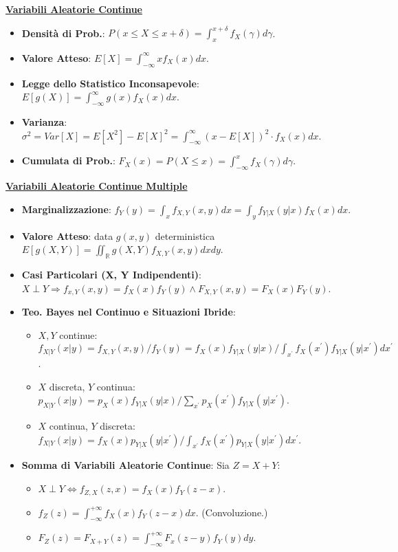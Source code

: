 \documentclass{article}
\begin{document}
\begin{multicols*}{3}
\textbf{\underline{Variabili Aleatorie Continue}}
\begin{itemize}
    \item \textbf{Densità di Prob.}: $P(x\leq X\leq x+\delta)=\int_{x}^{x+\delta}f_{X}(\gamma)d\gamma$.
    \item \textbf{Valore Atteso}: $E[X]=\int_{-\infty}^{\infty}xf_{X}(x)dx$.
    \item \textbf{Legge dello Statistico Inconsapevole}: $E[g(X)]=\int_{-\infty}^{\infty}g(x)f_{X}(x)dx$.
    \item \textbf{Varianza}: $\sigma^{2}=Var[X]=E[X^{2}]-E[X]^{2}=\int_{-\infty}^{\infty}(x-E[X])^{2}\cdot f_{X}(x)dx$.
    \item \textbf{Cumulata di Prob.}: $F_{X}(x)=P(X\leq x)=\int_{-\infty}^{x}f_{X}(\gamma)d\gamma$.
\end{itemize}

\textbf{\underline{Variabili Aleatorie Continue Multiple}}
\begin{itemize}
    \item \textbf{Marginalizzazione}: $f_{Y}(y)=\int_{x}f_{X,Y}(x,y)dx=\int_{y}f_{Y|X}(y|x)f_{X}(x)dx$.
    \item \textbf{Valore Atteso}: data $g(x,y)$ deterministica $E[g(X,Y)]=\iint_{\mathbb{R}}g(X,Y)f_{X,Y}(x,y)dxdy$.
    \item \textbf{Casi Particolari (X, Y Indipendenti)}: $X\perp Y\Rightarrow f_{x,Y}(x,y)=f_{X}(x)f_{Y}(y)\wedge F_{X,Y}(x,y)=F_{X}(x)F_{Y}(y)$.
    \item \textbf{Teo. Bayes nel Continuo e Situazioni Ibride}:
    \begin{itemize}
        \item $X,Y$ continue: $f_{X|Y}(x|y)={f_{X, Y}(x, y)}/{f_Y(y)}={f_X(x) f_{Y|X}(y|x)}/{\int_{x^{'}} f_X(x^{'})  f_{Y|X}(y|x^{'}) d x^{'}}$.
        \item $X$ discreta, $Y$ continua: $p_{X|Y}(x|y)={p_X(x) f_{Y|X}(y|x)}/{\sum_{x^{'}} p_X(x^{'})  f_{Y|X}(y|x^{'})}$.
        \item $X$ continua, $Y$ discreta: $f_{X|Y}(x|y)={f_X(x)  p_{Y|X}(y|x^{'})}/{\int_{x^{'}} f_X(x^{'})  p_{Y|X}(y|x^{'}) d x^{'}}$.
    \end{itemize}
    \item \textbf{Somma di Variabili Aleatorie Continue}: Sia $Z=X+Y$:
    \begin{itemize}
        \item $X\perp Y\Longleftrightarrow f_{Z,X}(z,x)=f_X(x)f_Y(z-x)$.
        \item $f_Z(z)=\int_{-\infty}^{+\infty}f_X(x)f_Y(z-x)dx$. (Convoluzione.)
        \item $F_Z(z)=F_{X+Y}(z)=\int_{-\infty}^{+\infty}F_x(z-y)f_Y(y)dy$.
    \end{itemize}
\end{itemize}


\end{multicols*}
\end{document}
